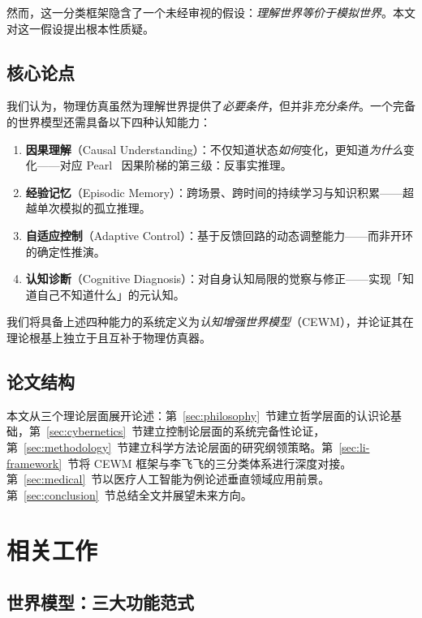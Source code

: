 \documentclass[11pt,a4paper]{article}
\newcommand{\CEWM}{\textsc{CEWM}}
\begin{document}
然而，这一分类框架隐含了一个未经审视的假设：\emph{理解世界等价于模拟世界}。本文对这一假设提出根本性质疑。

\subsection{核心论点}

我们认为，物理仿真虽然为理解世界提供了\emph{必要条件}，但并非\emph{充分条件}。一个完备的世界模型还需具备以下四种认知能力：
\begin{enumerate}[nosep]
  \item \textbf{因果理解}（Causal Understanding）：不仅知道状态\emph{如何}变化，更知道\emph{为什么}变化——对应 Pearl~\citeyearpar{pearl2009causality} 因果阶梯的第三级：反事实推理。
  \item \textbf{经验记忆}（Episodic Memory）：跨场景、跨时间的持续学习与知识积累——超越单次模拟的孤立推理。
  \item \textbf{自适应控制}（Adaptive Control）：基于反馈回路的动态调整能力——而非开环的确定性推演。
  \item \textbf{认知诊断}（Cognitive Diagnosis）：对自身认知局限的觉察与修正——实现「知道自己不知道什么」的元认知。
\end{enumerate}

我们将具备上述四种能力的系统定义为\emph{认知增强世界模型}（\CEWM{}），并论证其在理论根基上独立于且互补于物理仿真器。

\subsection{论文结构}

本文从三个理论层面展开论述：第~\ref{sec:philosophy}~节建立哲学层面的认识论基础，第~\ref{sec:cybernetics}~节建立控制论层面的系统完备性论证，第~\ref{sec:methodology}~节建立科学方法论层面的研究纲领策略。第~\ref{sec:li-framework}~节将 \CEWM{} 框架与李飞飞的三分类体系进行深度对接。第~\ref{sec:medical}~节以医疗人工智能为例论述垂直领域应用前景。第~\ref{sec:conclusion}~节总结全文并展望未来方向。

\section{相关工作}\label{sec:related}

\subsection{世界模型：三大功能范式}
\end{document}
